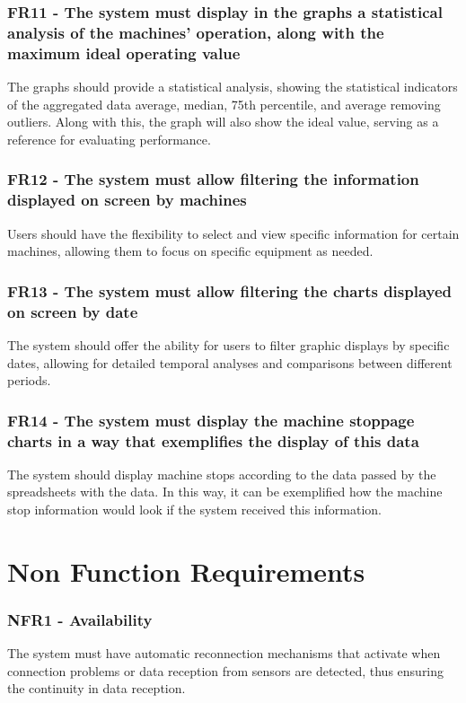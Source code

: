 \subsubsection{FR11 - The system must display in the graphs a statistical analysis of the machines' operation, along with the maximum ideal operating value}
The graphs should provide a statistical analysis, showing the statistical indicators of the aggregated data average, median, 75th percentile, and average removing outliers. Along with this, the graph will also show the ideal value, serving as a reference for evaluating performance.

\subsubsection{FR12 - The system must allow filtering the information displayed on screen by machines}
Users should have the flexibility to select and view specific information for certain machines, allowing them to focus on specific equipment as needed.

\subsubsection{FR13 - The system must allow filtering the charts displayed on screen by date}
The system should offer the ability for users to filter graphic displays by specific dates, allowing for detailed temporal analyses and comparisons between different periods.

\subsubsection{FR14 - The system must display the machine stoppage charts in a way that exemplifies the display of this data}The system should display machine stops according to the data passed by the spreadsheets with the data. In this way, it can be exemplified how the machine stop information would look if the system received this information.

\section{Non Function Requirements}\label{nonfunctionrequirements}

\subsubsection{NFR1 - Availability}The system must have automatic reconnection mechanisms that activate when connection problems or data reception from sensors are detected, thus ensuring the continuity in data reception.

